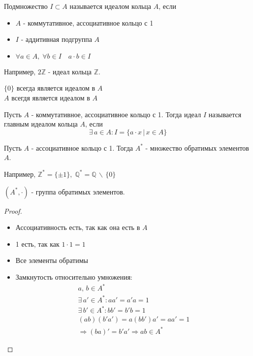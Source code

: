 \begin{conj}
    Подмножество $I \subset A$ называется идеалом кольца $A$, если 
    \begin{itemize}
        \item $A$ - коммутативное, ассоциативное кольцо с 1 
        \item $I$ - аддитивная подгруппа $A$ 
        \item $\forall a \in A,\; \forall b \in I \quad a \cdot b \in I$
    \end{itemize}
    Например, $2\mathbb{Z}$ - идеал кольца  $\mathbb{Z}$.
\end{conj}
\begin{notice} 
  
    $\{ 0 \}$ всегда является идеалом в $A$ \\
    $A$ всегдя является идеалом в $A$
\end{notice}
\begin{conj}
    Пусть $A$ - коммутативное, ассоциативное кольцо с 1. Тогда идеал $I$ называется главным идеалом кольца $A$, если 
    \[ \exists\, a \in A : I = \{ a \cdot x \, | \, x \in A \} \] 
\end{conj}
\vspace{0.7cm}
  
\begin{conj}
    Пусть $A$ - ассоциативное кольцо с 1. Тогда $A^*$ - множество обратимых элементов $A$.
  
    Например, $\mathbb{Z}^* = \{ \pm1 \},\; \mathbb{Q}^* = \mathbb{Q}\, \backslash\, \{ 0 \}$
\end{conj}
\begin{theorem-non}
    $(A^*, \cdot)$ - группа обратимых элементов.
\end{theorem-non}
\begin{proof} \quad
    \begin{itemize}
        \item Ассоциативность есть, так как она есть в $A$ 
        \item 1 есть, так как $1 \cdot 1 = 1$
        \item Все элементы обратимы
        \item Замкнутость относительно умножения:
        \begin{gather*}
            a,\, b \in A^* \\
            \exists\, a' \in A^* : aa' = a'a = 1 \\
            \exists\, b' \in A^* : bb' = b'b = 1 \\
            (ab)(b'a') = a(bb')a' = aa' = 1 \\
            \Rightarrow (ba)' = b'a' \Rightarrow ab \in A^*   
        \end{gather*}
    \end{itemize}
\end{proof}